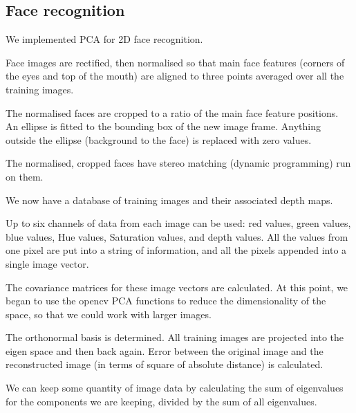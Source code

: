 
\subsection{Face recognition}
\label{sec:face-rec}

We implemented PCA for 2D face recognition.

Face images are rectified, then normalised so that main face features (corners of the eyes and top of the mouth) are aligned to three points averaged over all the training images.

The normalised faces are cropped to a ratio of the main face feature positions. An ellipse is fitted to the bounding box of the new image frame. Anything outside the ellipse (background to the face) is replaced with zero values.

The normalised, cropped faces have stereo matching (dynamic programming) run on them.

We now have a database of training images and their associated depth maps.

Up to six channels of data from each image can be used: red values, green values, blue values, Hue values, Saturation values, and depth values. All the values from one pixel are put into a string of information, and all the pixels appended into a single image vector.

The covariance matrices for these image vectors are calculated. At this point, we began to use the opencv PCA functions to reduce the dimensionality of the space, so that we could work with larger images.

The orthonormal basis is determined. All training images are projected into the eigen space and then back again. Error between the original image and the reconstructed image (in terms of square of absolute distance) is calculated.

We can keep some quantity of image data by calculating the sum of eigenvalues for the components we are keeping, divided by the sum of all eigenvalues.

